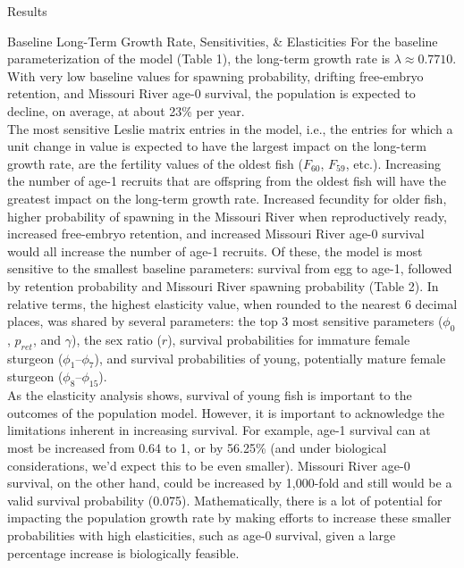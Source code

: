 \documentclass[12pt]{article}
\begin{document}
\begin{section}{Results}
\begin{subsection}{Baseline Long-Term Growth Rate, Sensitivities, \& Elasticities}
For the baseline parameterization of the model (Table 1), the long-term growth rate is $\lambda\approx 0.7710$.  With very low baseline values for spawning probability, drifting free-embryo retention, and Missouri River age-0 survival, the population is expected to decline, on average, at about 23\% per year.\\  

The most sensitive Leslie matrix entries in the model, i.e., the entries for which a unit change in value is expected to have the largest impact on the long-term growth rate, are the fertility values of the oldest fish ($F_{60}$, $F_{59}$, etc.).  Increasing the number of age-1 recruits that are offspring from the oldest fish will have the greatest impact on the long-term growth rate.  Increased fecundity for older fish, higher probability of spawning in the Missouri River when reproductively ready, increased free-embryo retention, and increased Missouri River age-0 survival would all increase the number of age-1 recruits.  Of these, the model is most sensitive to the smallest baseline parameters:  survival from egg to age-1, followed by retention probability and Missouri River spawning probability (Table 2).  In relative terms, the highest elasticity value, when rounded to the nearest 6 decimal places, was shared by several parameters:  the top 3 most sensitive parameters ($\phi_0$, $p_{ret}$, and $\gamma$), the sex ratio ($r$), survival probabilities for immature female sturgeon ($\phi_1$--$\phi_{7}$), and survival probabilities of young, potentially mature female sturgeon ($\phi_{8}$--$\phi_{15}$).\\

As the elasticity analysis shows, survival of young fish is important to the outcomes of the population model.  However, it is important to acknowledge the limitations inherent in increasing survival.  For example, age-1 survival can at most be increased from 0.64 to 1, or by 56.25\% (and under biological considerations, we'd expect this to be even smaller).  Missouri River age-0 survival, on the other hand, could be increased by 1,000-fold and still would be a valid survival probability (0.075).  Mathematically, there is a lot of potential for impacting the population growth rate by making efforts to increase these smaller probabilities with high elasticities, such as age-0 survival, given a large percentage increase is biologically feasible.      
\end{subsection}



\end{section}
\end{document}
